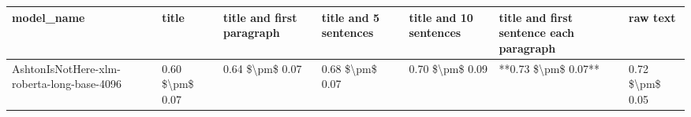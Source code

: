 \begin{tabular}{lllllll}
\toprule
                                model\_name &           title & title and first paragraph & title and 5 sentences & title and 10 sentences & title and first sentence each paragraph &        raw text \\
\midrule
AshtonIsNotHere-xlm-roberta-long-base-4096 & 0.60 \$\textbackslash pm\$ 0.07 &           0.64 \$\textbackslash pm\$ 0.07 &       0.68 \$\textbackslash pm\$ 0.07 &        0.70 \$\textbackslash pm\$ 0.09 &                     **0.73 \$\textbackslash pm\$ 0.07** & 0.72 \$\textbackslash pm\$ 0.05 \\
\bottomrule
\end{tabular}
